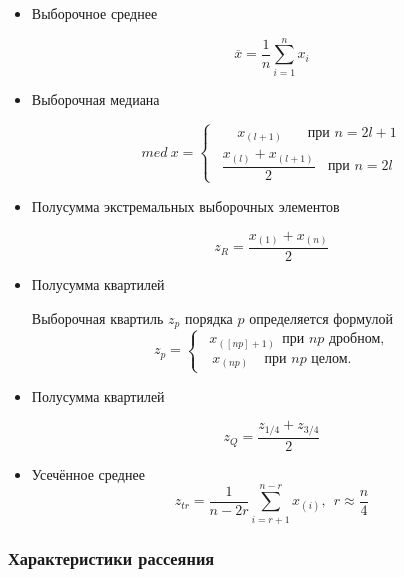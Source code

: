 \begin{itemize}
	\item Выборочное среднее
	
	\begin{equation}
		\overline{x} = \frac{1}{n}\sum\limits_{i=1}^n x_i
	\end{equation}

	\item Выборочная медиана
	
	\begin{equation}
		med \ x = 
		\begin{cases} 
			\ \ \ \ \ \ \  x_{(l+1)} \ \ \ \ \ \ \ \  \text{при } n = 2l + 1\\
			\ \  \dfrac{x_{(l)} + x_{(l+1)}}{2} \ \ \ \  \text{при } n = 2l
		\end{cases}
	\end{equation}

	\item Полусумма экстремальных выборочных элементов
	
	\begin{equation}
		z_{R} = \dfrac{x_{(1)} + x_{(n)}}{2}
	\end{equation}
	
	\item Полусумма квартилей
	
	Выборочная квартиль $z_{p}$ порядка $p$ определяется формулой
	\begin{equation}
		z_{p} = 
		\begin{cases}
			\ \  x_{([np]+1)} \ \  \text{при $np$ дробном,} \\
			\ \ \  x_{(np)} \ \ \ \ \  \text{при $np$ целом.}
		\end{cases}
	\end{equation}
	
	\item Полусумма квартилей
	
	\begin{equation}
		z_{Q} = \dfrac{z_{1/4} + z_{3/4}}{2}
	\end{equation}

	\item Усечённое среднее
	\begin{equation}
		z_{tr} = \frac{1}{n-2r} \sum\limits_{i=r+1}^{n-r} x_{(i)}, \ \ r \approx \frac{n}{4}
	\end{equation}
\end{itemize}

\subsubsection{Характеристики рассеяния}

